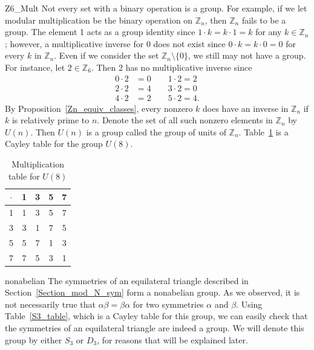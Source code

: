 \begin{example}{Z6_Mult}
Not every set with a binary operation is a group.  For example, if we let modular multiplication be the binary operation on ${\mathbb Z}_n$, then ${\mathbb Z}_n$ fails to be a group.  The element 1 acts as a group identity since $1 \cdot k = k \cdot 1 = k$ for any $k \in {\mathbb Z}_n$; however, a multiplicative inverse for $0$ does not exist since $0 \cdot k = k \cdot 0 = 0$ for every $k$ in ${\mathbb Z}_n$.  Even if we consider the set ${\mathbb Z}_n \setminus \{0 \}$, we still may not have a group.  For instance, let $2 \in {\mathbb Z}_6$. Then 2 has no multiplicative inverse since 
\begin{align*}
0 \cdot 2 & = 0 \qquad 1 \cdot 2 = 2 \\
2 \cdot 2 & = 4 \qquad 3 \cdot 2 = 0 \\
4 \cdot 2 & = 2 \qquad 5 \cdot 2 = 4.
\end{align*}
By Proposition~\ref{Zn_equiv_classes}, every nonzero $k$ does have an inverse in ${\mathbb Z}_n$ if $k$ is relatively prime to $n$.  Denote the set of all such nonzero elements in ${\mathbb Z}_n$ by $U(n)$\label{groupofunits}.  Then $U(n)$ is a group called the {\bfi group of units\/} of ${\mathbb Z}_n$.  Table~\ref{cayley_table_U8} is a Cayley table for the group $U(8)$. 
\end{example}

\begin{table}[htb]
\caption{Multiplication table for $U(8)$}{\small
\begin{center}
\begin{tabular}{c|cccc}
$\cdot$ & 1 & 3 & 5 & 7 \\
\hline
1       & 1 & 3 & 5 & 7 \\
3       & 3 & 1 & 7 & 5 \\
5       & 5 & 7 & 1 & 3 \\
7       & 7 & 5 & 3 & 1
\end{tabular}
\end{center}
}
\label{cayley_table_U8}
\end{table}



\begin{example}{nonabelian}
The symmetries of an equilateral triangle described in Section~\ref{Section_mod_N_sym} form a nonabelian group. As we observed, it is not necessarily true that $\alpha \beta = \beta \alpha$ for two symmetries $\alpha$ and $\beta$.  Using Table~\ref{S3_table}, which is a Cayley table for this group, we can easily check that the symmetries of an equilateral triangle are indeed a group. We will denote this group by either $S_3$ or $D_3$, for reasons that will be explained later. 
\end{example}



